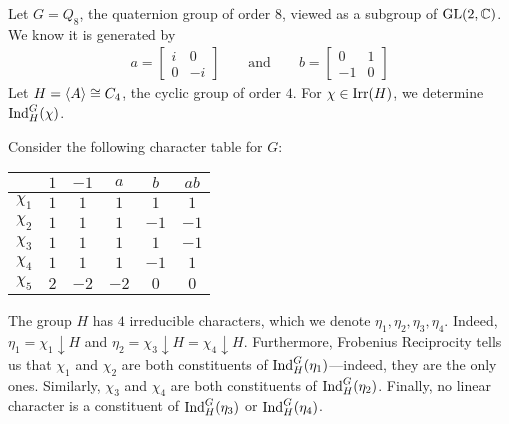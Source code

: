 
\begin{boxexample}
    Let $G = Q_8$, the quaternion group of order $8$, viewed as a subgroup of $\operatorname{GL}\!\left( 2, \mathbb{C} \right)$. We know it is generated by
    \begin{align*}
        a = \begin{bmatrix}
            i & 0 \\ 0 & -i
        \end{bmatrix}
        \quad\quad
        \text{and}
        \quad\quad
        b = \begin{bmatrix}
            0 & 1 \\ -1 & 0
        \end{bmatrix}
    \end{align*}
    Let $H = \left\langle A \right\rangle \cong C_4$, the cyclic group of order $4$. For $\chi \in \operatorname{Irr}\!\left( H \right)$, we determine $\operatorname{Ind}_H^G(\chi)$.

    Consider the following character table for $G$:
    \begin{table}[H]
        \centering
        \begin{tabular}{c|ccccc}
            & $1$ & $-1$ & $a$ & $b$ & $ab$ \\
            \hline
            $\chi_1$ & $1$ & $1$ & $1$ & $1$ & $1$ \\
            $\chi_2$ & $1$ & $1$ & $1$ & $-1$ & $-1$ \\
            $\chi_3$ & $1$ & $1$ & $1$ & $1$ & $-1$ \\
            $\chi_4$ & $1$ & $1$ & $1$ & $-1$ & $1$ \\
            $\chi_5$ & $2$ & $-2$ & $-2$ & $0$ & $0$
        \end{tabular}
    \end{table}
    The group $H$ has $4$ irreducible characters, which we denote $\eta_1, \eta_2, \eta_3, \eta_4$. Indeed, $\eta_1 = \chi_1 \downarrow H$ and $\eta_2 = \chi_3 \downarrow H = \chi_4 \downarrow H$. Furthermore, Frobenius Reciprocity tells us that $\chi_1$ and $\chi_2$ are both constituents of $\operatorname{Ind}_H^G(\eta_1)$---indeed, they are the only ones. Similarly, $\chi_3$ and $\chi_4$ are both constituents of $\operatorname{Ind}_H^G(\eta_2)$. Finally, no linear character is a constituent of $\operatorname{Ind}_H^G(\eta_3)$ or $\operatorname{Ind}_H^G(\eta_4)$.
\end{boxexample}